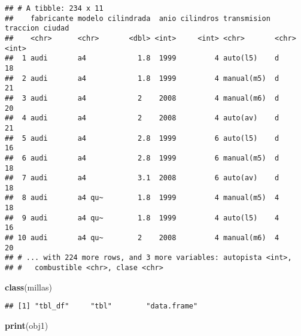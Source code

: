\documentclass[]{article}
\newenvironment{Shaded}{\begin{snugshade}}{\end{snugshade}}
\newcommand{\CommentTok}[1]{\textcolor[rgb]{0.56,0.35,0.01}{\textit{#1}}}
\newcommand{\KeywordTok}[1]{\textcolor[rgb]{0.13,0.29,0.53}{\textbf{#1}}}
\newcommand{\NormalTok}[1]{#1}
\newcommand{\OperatorTok}[1]{\textcolor[rgb]{0.81,0.36,0.00}{\textbf{#1}}}
\newcommand{\StringTok}[1]{\textcolor[rgb]{0.31,0.60,0.02}{#1}}
\begin{document}
\begin{Shaded}
\end{Shaded}

\begin{verbatim}
## # A tibble: 234 x 11
##    fabricante modelo cilindrada  anio cilindros transmision traccion ciudad
##    <chr>      <chr>       <dbl> <int>     <int> <chr>       <chr>     <int>
##  1 audi       a4            1.8  1999         4 auto(l5)    d            18
##  2 audi       a4            1.8  1999         4 manual(m5)  d            21
##  3 audi       a4            2    2008         4 manual(m6)  d            20
##  4 audi       a4            2    2008         4 auto(av)    d            21
##  5 audi       a4            2.8  1999         6 auto(l5)    d            16
##  6 audi       a4            2.8  1999         6 manual(m5)  d            18
##  7 audi       a4            3.1  2008         6 auto(av)    d            18
##  8 audi       a4 qu~        1.8  1999         4 manual(m5)  4            18
##  9 audi       a4 qu~        1.8  1999         4 auto(l5)    4            16
## 10 audi       a4 qu~        2    2008         4 manual(m6)  4            20
## # ... with 224 more rows, and 3 more variables: autopista <int>,
## #   combustible <chr>, clase <chr>
\end{verbatim}

\begin{Shaded}
\begin{Highlighting}[]
\KeywordTok{class}\NormalTok{(millas)}
\end{Highlighting}
\end{Shaded}

\begin{verbatim}
## [1] "tbl_df"     "tbl"        "data.frame"
\end{verbatim}

\begin{Shaded}
\begin{Highlighting}[]
\KeywordTok{print}\NormalTok{(obj1)}
\end{Highlighting}
\end{Shaded}
\end{document}
